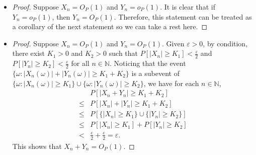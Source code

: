 \documentclass{article}
\newcommand{\eps}{\varepsilon}
\newcommand{\nn}{\mathbb{N}}
\theoremstyle{definition}
\theoremstyle{plain}
\theoremstyle{remark}
\begin{document}
\begin{description}
\begin{itemize}
\begin{proof}
Suppose $X_n = O_P(1)$ and $Y_n = o_P(1)$. Given $\eps > 0$, since $X_n = O_P(1)$, 
there exists $K > 0$ such that $P[|X_n| \geq K] < \frac{\eps}{2}$ for all $n \in \nn$. 
In addition, $Y_n = o_P(1)$ implies that there exists $N \in \nn$ such that
$P[|Y_n| \geq \eps/K] < \frac{\eps}{2}$ for all $n > N$. It then follows that for each 
$n > N$,
\begin{align*}
& P[|X_nY_n| \geq \eps] = P[|X_nY_n| \geq \eps, |X_n| \geq K] + P[|X_nY_n| \geq \eps, 
|X_n| < K] \\
\leq & P[|X_n| \geq K] + P[|Y_n| \geq \eps/K] < \frac{\eps}{2} + \frac{\eps}{2} = \eps.
\end{align*}
Therefore $X_nY_n \to_P 0$, i.e., $X_nY_n = o_P(1)$. 
\end{proof}

\item 
\begin{proof}
Suppose $X_n = O_P(1)$ and $Y_n = o_P(1)$. It is clear that if $Y_n = o_P(1)$, then $Y_n = O_P(1)$. Therefore, this statement can be treated as a corollary of the next statement so we can take a rest here.\end{proof}

\item \begin{proof}
Suppose $X_n = O_P(1)$ and $Y_n = O_P(1)$. Given $\eps > 0$, by condition, there exist $K_1 > 0$ and $K_2 > 0$ such that $P[|X_n| \geq K_1] < \frac{\eps}{2}$ and $P[|Y_n| \geq K_2] < \frac{\eps}{2}$ for all $n \in \nn$. Noticing that the event $\{\omega: |X_n(\omega)| + |Y_n(\omega)| \geq K_1 + K_2\}$ is a subevent of $\{\omega: |X_n(\omega)| \geq K_1\} \cup \{\omega: |Y_n(\omega)| \geq K_2\}$, we have for each $n \in \nn$,
\begin{align*}
& P[|X_n + Y_n| \geq K_1 + K_2] \\
\leq & P[|X_n| + |Y_n| \geq K_1 + K_2] \\
\leq & P[\{|X_n| \geq K_1\} \cup \{|Y_n| \geq K_2\}] \\
\leq & P[|X_n| \geq K_1] + P[|Y_n| \geq K_2] \\
< & \frac{\eps}{2} + \frac{\eps}{2} = \eps.
\end{align*}
This shows that $X_n + Y_n = O_P(1)$. 
\end{proof}


\end{itemize}
\end{description}
\end{document}
